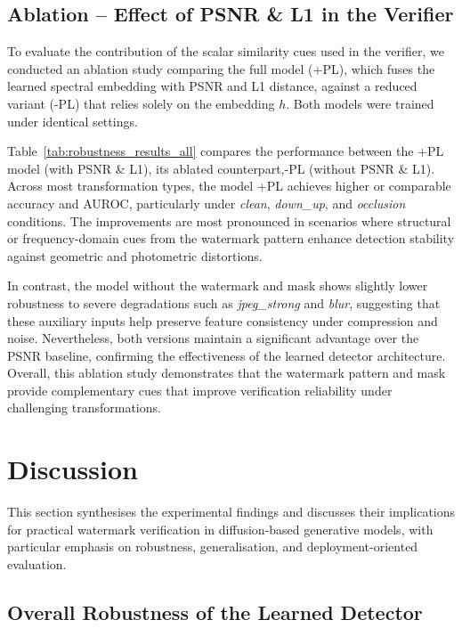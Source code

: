 \documentclass[lettersize,journal,review]{IEEEtran}
\begin{document}
\subsection{Ablation -- Effect of PSNR \& L1 in the Verifier}

To evaluate the contribution of the scalar similarity cues used in the verifier, 
we conducted an ablation study comparing the full model (+PL), which fuses the learned spectral embedding with PSNR and L1 distance, against a reduced variant (-PL) that relies solely on the embedding $h$. 
Both models were trained under identical settings.

Table~\ref{tab:robustness_results_all} compares the performance between the +PL model (with PSNR \& L1), its ablated counterpart,-PL (without PSNR \& L1). 
Across most transformation types, the model +PL achieves higher or comparable accuracy 
and AUROC, particularly under \textit{clean}, \textit{down\_up}, and \textit{occlusion} conditions. The improvements are most pronounced in scenarios where structural or frequency-domain cues from the watermark pattern enhance detection stability against geometric and photometric distortions.

In contrast, the model without the watermark and mask shows slightly lower robustness to severe degradations such as \textit{jpeg\_strong} and \textit{blur}, suggesting that these auxiliary inputs help preserve feature consistency under compression and noise. Nevertheless, both versions maintain a significant advantage over the PSNR baseline, confirming the effectiveness of the learned detector architecture. 
Overall, this ablation study demonstrates that the watermark pattern and mask provide complementary cues that improve verification reliability under challenging transformations.

\section{Discussion}

This section synthesises the experimental findings and discusses their implications for practical watermark verification in diffusion-based generative models, with particular emphasis on robustness, generalisation, and deployment-oriented evaluation.

\subsection{Overall Robustness of the Learned Detector}
\end{document}
